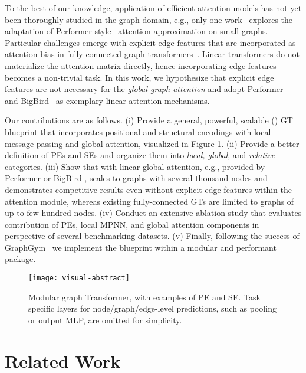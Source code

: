 \documentclass{article}
\begin{document}
To the best of our knowledge, application of efficient attention models has not yet been thoroughly studied in the graph domain, e.g., only one work~\cite{choromanski2021blocktoeplitz} explores the adaptation of Performer-style~\cite{DBLP:conf/iclr/ChoromanskiLDSG21} attention approximation on small graphs. Particular challenges emerge with explicit edge features that are incorporated as attention bias in fully-connected graph transformers~\cite{kreuzer2021rethinking, ying2021graphormer}.
Linear transformers do not materialize the attention matrix directly, hence incorporating edge features becomes a non-trivial task.
In this work, we hypothesize that explicit edge features are not necessary for the \emph{global graph attention} and adopt Performer~\cite{DBLP:conf/iclr/ChoromanskiLDSG21} and BigBird~\cite{DBLP:conf/nips/ZaheerGDAAOPRWY20} as exemplary linear attention mechanisms.

Our contributions are as follows. (i) Provide a general, powerful, scalable (\method) GT blueprint that incorporates positional and structural encodings with local message passing and global attention, visualized in Figure \ref{fig:visual-abstract}. (ii) Provide a better definition of PEs and SEs and organize them into \textit{local, global}, and \textit{relative} categories. (iii) Show that \method with linear global attention, e.g., provided by Performer \cite{DBLP:conf/iclr/ChoromanskiLDSG21} or BigBird \cite{DBLP:conf/nips/ZaheerGDAAOPRWY20}, scales to graphs with several thousand nodes and demonstrates competitive results even without explicit edge features within the attention module, whereas existing fully-connected GTs \cite{kreuzer2021rethinking, ying2021graphormer} are limited to graphs of up to few hundred nodes. (iv) Conduct an extensive ablation study that evaluates contribution of PEs, local MPNN, and global attention components in perspective of several benchmarking datasets. (v) Finally, following the success of GraphGym~\cite{you2020design} we implement the blueprint within a modular and performant \gtgym package. 


\begin{figure}[t]
  \centering
  \texttt{[image: visual-abstract]}
  \caption{Modular \method graph Transformer,
with examples of PE and SE. Task specific layers for node/graph/edge-level predictions, such as pooling or output MLP, are omitted for simplicity.
  }
  \label{fig:visual-abstract}
\end{figure}


\section{Related Work}
\end{document}
